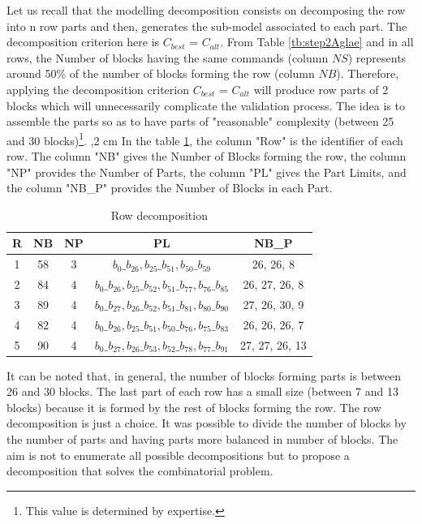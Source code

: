 \documentclass[preprint,3p,times,twocolumn]{elsarticle}
\begin{document}
Let us recall that the modelling decomposition consists on decomposing the row into n row parts and then, generates the sub-model associated to each part. The decomposition criterion here is $C_{best}$ = $C_{alt}$. From Table \ref{tb:step2Aglae} and in all rows, the Number of blocks having the same commands (column $NS$) represents around 50\% of the number of blocks forming the row (column $NB$). Therefore, applying the decomposition criterion $C_{best}$ = $C_{alt}$ will produce row parts of 2 blocks which will unnecessarily complicate the validation process. The idea is to assemble the parts so as to have parts of "reasonable" complexity (between 25 and 30 blocks)\footnote{This value is determined by expertise.}. 
,2 cm
In the table \ref{tb:rowDec}, the column "Row" is the identifier of each row. The column "NB" gives the Number of Blocks forming the row, the column "NP" provides the Number of Parts, the column "PL" gives the Part Limits, and the column "NB\_P" provides the Number of Blocks in each Part.
\begin{table}[ht]
\begin{center}
\begin{tabular}{|c|c|c|c|c|} 
\hline 
R		& NB    & NP  &	PL     & NB\_P       \\ \hline
1		& 58    & 3	   & $b_0\_b_{26}, b_{25}\_b_{51}, b_{50}\_b_{59}$	      &   26, 26, 8       \\ \hline
2		& 84	& 4    & $b_0\_b_{26}, b_{25}\_b_{52}, b_{51}\_b_{77}, b_{76}\_b_{85}$	      & 26, 27, 26, 8          \\ \hline 
3	    & 89	& 4	   & $b_0\_b_{27}, b_{26}\_b_{52}, b_{51}\_b_{81}, b_{80}\_b_{90} $     & 27, 26, 30, 9         \\ \hline 
4   	& 82	& 4    & $b_0\_b_{26}, b_{25}\_b_{51}, b_{50}\_b_{76}, b_{75}\_b_{83} $	      & 26, 26, 26, 7        \\ \hline
5	    & 90	& 4    & $b_0\_b_{27}, b_{26}\_b_{53}, b_{52}\_b_{78}, b_{77}\_b_{91} $ 	      &  27, 27, 26, 13       \\ \hline
    
\end{tabular} 
\caption{Row decomposition}\label{tb:rowDec}
\end{center}
\end{table}

It can be noted that, in general, the number of blocks forming parts is between 26 and 30 blocks. The last part of each row has a small size (between 7 and 13 blocks) because it is formed by the rest of blocks forming the row. The row decomposition is just a choice. It was possible to divide the number of blocks by the number of parts and having parts more balanced in number of blocks. The aim is not to enumerate all possible decompositions but to propose a decomposition that solves the combinatorial problem. 
\end{document}
